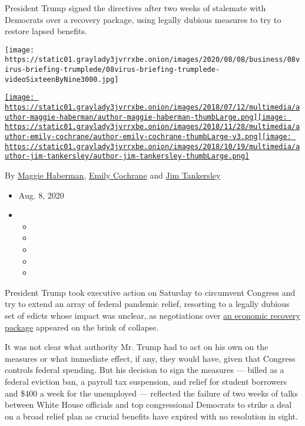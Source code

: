President Trump signed the directives after two weeks of stalemate with
Democrats over a recovery package, using legally dubious measures to try
to restore lapsed benefits.

\texttt{[image: https://static01.graylady3jvrrxbe.onion/images/2020/08/08/business/08virus-briefing-trumplede/08virus-briefing-trumplede-videoSixteenByNine3000.jpg]}

\href{https://www.nytimes3xbfgragh.onion/by/maggie-haberman}{\texttt{[image: https://static01.graylady3jvrrxbe.onion/images/2018/07/12/multimedia/author-maggie-haberman/author-maggie-haberman-thumbLarge.png]}}\href{https://www.nytimes3xbfgragh.onion/by/emily-cochrane}{\texttt{[image: https://static01.graylady3jvrrxbe.onion/images/2018/11/28/multimedia/author-emily-cochrane/author-emily-cochrane-thumbLarge-v3.png]}}\href{https://www.nytimes3xbfgragh.onion/by/jim-tankersley}{\texttt{[image: https://static01.graylady3jvrrxbe.onion/images/2018/10/19/multimedia/author-jim-tankersley/author-jim-tankersley-thumbLarge.png]}}

By \href{https://www.nytimes3xbfgragh.onion/by/maggie-haberman}{Maggie
Haberman},
\href{https://www.nytimes3xbfgragh.onion/by/emily-cochrane}{Emily
Cochrane} and
\href{https://www.nytimes3xbfgragh.onion/by/jim-tankersley}{Jim
Tankersley}

\begin{itemize}
\item
  Aug. 8, 2020
\item
  \begin{itemize}
  \item
  \item
  \item
  \item
  \item
  \end{itemize}
\end{itemize}

President Trump took executive action on Saturday to circumvent Congress
and try to extend an array of federal pandemic relief, resorting to a
legally dubious set of edicts whose impact was unclear, as negotiations
over
\href{https://www.nytimes3xbfgragh.onion/2020/08/08/world/coronavirus-updates.html}{an
economic recovery package} appeared on the brink of collapse.

It was not clear what authority Mr. Trump had to act on his own on the
measures or what immediate effect, if any, they would have, given that
Congress controls federal spending. But his decision to sign the
measures --- billed as a federal eviction ban, a payroll tax suspension,
and relief for student borrowers and \$400 a week for the unemployed ---
reflected the failure of two weeks of talks between White House
officials and top congressional Democrats to strike a deal on a broad
relief plan as crucial benefits have expired with no resolution in
sight.

